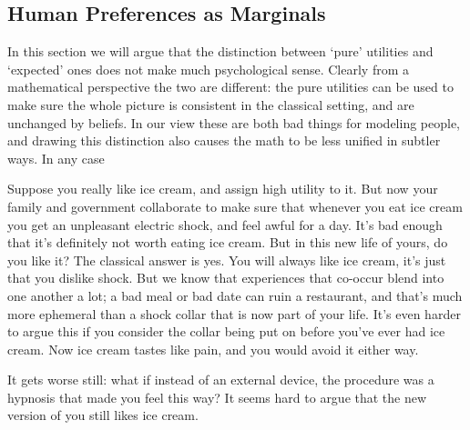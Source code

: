 \documentclass{article}
\begin{document}
	
	


	\subsection{Human Preferences as Marginals}	\label{sec:human-pref-marginals}
	In this section we will argue that the distinction between `pure' utilities and `expected' ones does not make much psychological sense. Clearly from a mathematical perspective the two are different: the pure utilities can be used to make sure the whole picture is consistent in the classical setting, and are unchanged by beliefs. In our view these are both bad things for modeling people, and drawing this distinction also causes the math to be less unified in subtler ways. In any case
	
	\begin{example}
		Suppose you really like ice cream, and assign high utility to it. But now your family and government collaborate to make sure that whenever you eat ice cream you get an unpleasant electric shock, and feel awful for a day. It's bad enough that it's definitely not worth eating ice cream. But in this new life of yours, do you like it? The classical answer is yes. You will always like ice cream, it's just that you dislike shock. But we know that experiences that co-occur blend into one another a lot; a bad meal or bad date can ruin a restaurant, and that's much more ephemeral than a shock collar that is now part of your life. It's even harder to argue this if you consider the collar being put on before you've ever had ice cream. Now ice cream tastes like pain, and you would avoid it either way.		
		
		It gets worse still: what if instead of an external device, the procedure was a hypnosis that made you feel this way? It seems hard to argue that the new version of you still likes ice cream.
	\end{example}
\end{document}
